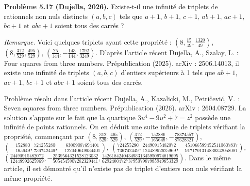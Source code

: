 \textbf{Problème 5.17 (Dujella, 2026).} Existe-t-il une infinité de triplets de rationnels non nuls distincts $(a,b,c)$ tels que $a+1$, $b+1$, $c+1$, $ab+1$, $ac+1$, $bc+1$ et $abc+1$ soient tous des carrés ?

\medskip

\textit{Remarque.} Voici quelques triplets ayant cette propriété : $(8, \frac{15}{49}, \frac{1320}{49})$, $(8, \frac{312}{529}, \frac{495}{529})$, $(\frac{25}{144}, -\frac{143}{144}, \frac{1792}{3249})$. D'après l'article récent Dujella, A., Szalay, L. : Four squares from three numbers. Prépublication (2025). arXiv : 2506.14013, il existe une infinité de triplets $(a,b,c)$ d'entiers supérieurs à 1 tels que $ab+1$, $ac+1$, $bc+1$ et $abc+1$ soient tous des carrés.

Problème résolu dans l'article récent Dujella, A., Kazalicki, M., Petričević, V. : Seven squares from three numbers. Prépublication (2026). arXiv : 2604.08729. La solution s'appuie sur le fait que la quartique $3u^4-9u^2+7=z^2$ possède une infinité de points rationnels. On en déduit une suite infinie de triplets vérifiant la propriété, commençant par
$(8,\frac{312}{529},\frac{495}{529})$,
$(\frac{312}{529},-\frac{152880}{165649},-\frac{78374557}{87628321})$,
$(-\frac{152880}{165649},\frac{724255280}{736742449},-\frac{63009087694401}{122040649934401})$,
$(\frac{724255280}{736742449},\frac{24490915482072}{12448992625969},-\frac{4510665894525110607837}{9171701314839342058081})$,
$(\frac{24490915482072}{12448992625969},-\frac{2539564321528123032}{5054545907282329441},\frac{14261842404349331345950974819695}{62924004727379507987985949853329})$.
Dans le même article, il est démontré qu'il n'existe pas de triplet d'entiers non nuls vérifiant la même propriété.
